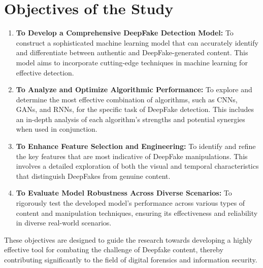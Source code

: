 \documentclass[12pt]{extarticle}
\begin{document}
\section{Objectives of the Study}

\begin{enumerate}
    \item \textbf{To Develop a Comprehensive DeepFake Detection Model:} To construct a sophisticated machine learning model that can accurately identify and differentiate between authentic and DeepFake-generated content. This model aims to incorporate cutting-edge techniques in machine learning for effective detection.

\item \textbf{To Analyze and Optimize Algorithmic Performance:} To explore and determine the most effective combination of algorithms, such as CNNs, GANs, and RNNs, for the specific task of DeepFake detection. This includes an in-depth analysis of each algorithm's strengths and potential synergies when used in conjunction.

\item \textbf{To Enhance Feature Selection and Engineering:} To identify and refine the key features that are most indicative of DeepFake manipulations. This involves a detailed exploration of both the visual and temporal characteristics that distinguish DeepFakes from genuine content.

\item \textbf{To Evaluate Model Robustness Across Diverse Scenarios:} To rigorously test the developed model's performance across various types of content and manipulation techniques, ensuring its effectiveness and reliability in diverse real-world scenarios.
\end{enumerate}

These objectives are designed to guide the research towards developing a highly effective tool for combating the challenge of Deepfake content, thereby contributing significantly to the field of digital forensics and information security.
\end{document}
